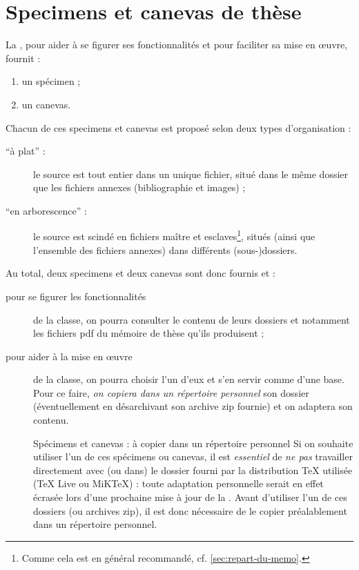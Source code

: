 \chapter{Specimens et canevas de thèse}\label{cha:specimen-canevas}%

La \yatcl, pour aider à se figurer ses fonctionnalités et pour faciliter sa mise
en œuvre, fournit :
\begin{enumerate}
\item un spécimen ;
\item un canevas.
\end{enumerate}
Chacun de ces specimens et canevas est proposé selon deux types d'organisation :
\begin{description}
\item[\enquote{à plat} :] le source  est tout entier dans un unique
  fichier, situé dans le même dossier que les fichiers annexes (bibliographie et
  images) ;
\item[\enquote{en arborescence} :] le source  est scindé en fichiers
  maître et esclaves\footnote{Comme cela est en général recommandé,
    cf. \vref{sec:repart-du-memo}.}, situés (ainsi que l'ensemble des fichiers
  annexes) dans différents (sous-)dossiers.
\end{description}
Au total, deux specimens et deux canevas sont donc fournis et :
\begin{description}
\item[pour se figurer les fonctionnalités] de la classe, on pourra consulter le
  contenu de leurs dossiers et notamment les fichiers \acrshort{pdf} du mémoire
  de thèse qu'ils produisent ;
\item[pour aider à la mise en œuvre] de la classe, on pourra choisir l'un d'eux
  et s'en servir comme d'une base. Pour ce faire, \emph{on copiera dans un
    répertoire personnel} son dossier (éventuellement en désarchivant son
  archive \gls{zip} fournie) et on adaptera son contenu.
  \begin{dbwarning}{Spécimens et canevas : à copier dans un répertoire
      personnel}{}
  Si on souhaite utiliser l'un de ces spécimens ou canevas, il est
  \emph{essentiel} de \emph{ne pas} travailler directement avec (ou dans) le
  dossier fourni par la distribution \TeX{} utilisée (\TeX{} Live ou
  MiK\TeX{}) : toute adaptation personnelle serait en effet écrasée lors d'une
  prochaine mise à jour de la \yatcl{}. Avant d'utiliser l'un de ces dossiers
  (ou archives \gls{zip}), il est donc nécessaire de le copier préalablement
  dans un répertoire personnel.
\end{dbwarning}
\end{description}

